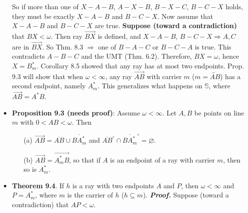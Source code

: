 \documentclass{report}
\begin{document}
\begin{itemize}
            \bigbreak \noindent 
            So if more than one of \( X - A - B \), \( A - X - B \), \( B - X - C \), \( B - C - X \) holds,  
            they must be exactly \( X - A - B \) and \( B - C - X \).
            \bigbreak \noindent 
            Now assume that \( X - A - B \) and \( B - C - X \) are true.
            \bigbreak \noindent 
            \textbf{Suppose (toward a contradiction)} that \( BX < \omega \).  
            \bigbreak \noindent 
            Then ray \( \overrightarrow{BX} \) is defined,  
            and \( X - A - B \), \( B - C - X \Rightarrow A, C \) are in \( \overrightarrow{BX} \).  
            \bigbreak \noindent 
            So Thm. 8.3 \( \Rightarrow \) one of \( B - A - C \) or \( B - C - A \) is true.  
            \bigbreak \noindent 
            This contradicts \( A - B - C \) and the UMT (Thm. 6.2).  
            \bigbreak \noindent 
            Therefore, \( BX = \omega \), hence \( X = B_m^* \).
            \bigbreak \noindent 
            Corollary 8.5 showed that any ray has at most two endpoints.  
            Prop. 9.3 will show that when \( \omega < \infty \), any ray \( \overrightarrow{AB} \) with carrier \( m \)  
            (\( m = \overleftrightarrow{AB} \)) has a second endpoint, namely \( A_m^* \).  
            This generalizes what happens on \( \mathbb{S} \), where \( \overrightarrow{AB} = A^*B \).
        \item \textbf{Proposition 9.3 (needs proof)}: Assume \( \omega < \infty \). Let \( A, B \) be points on line \( m \)  
            with \( 0 < AB < \omega \). Then  
            \begin{enumerate}
                \item[(a)] \( \overrightarrow{AB} = \overline{AB} \cup \overline{BA_m^*} \) and \( \overline{AB}^{\circ} \cap \overline{BA_m^*}^{\circ} = \varnothing \).
                \item[(b)] \( \overrightarrow{AB} = \overrightarrow{A_m^* B} \), so that if \( A \) is an endpoint of a ray  
                    with carrier \( m \), then so is \( A_m^* \).
            \end{enumerate}
        \item \textbf{Theorem 9.4}.
            If \( h \) is a ray with two endpoints \( A \) and \( P \),  
            then \( \omega < \infty \) and \( P = A_m^* \), where \( m \) is the carrier of \( h \) (\( h \subseteq m \)).
            \bigbreak \noindent 
            \textbf{\textit{Proof.}} Suppose (toward a contradiction) that \( AP < \omega \).  
            \bigbreak \noindent 

\end{itemize}
\end{document}
